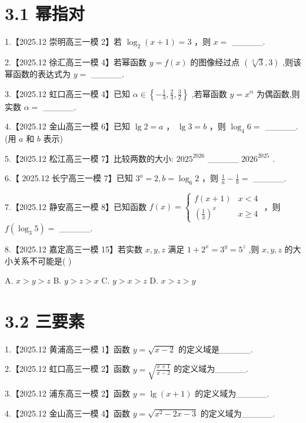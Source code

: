 \documentclass[10pt]{article}
\begin{document}
\section*{3.1 幂指对}

1.【2025.12 崇明高三一模 2】若 \({\log }_{2}\left( {x + 1}\right)  = 3\) ，则 \(x =\) \_\_\_\_\_.

2.【2025.12 徐汇高三一模 4】若幂函数 \(y = f\left( x\right)\) 的图像经过点 \(\left( {\sqrt[3]{3},3}\right)\) ,则该幂函数的表达式为 \(y =\) \_\_\_\_\_.

3.【2025.12 虹口高三一模 4】已知 \(\alpha  \in  \left\{  {-\frac{1}{3},\frac{2}{3},\frac{3}{2}}\right\}\) ,若幂函数 \(y = {x}^{\alpha }\) 为偶函数,则实数 \(\alpha  =\) \_\_\_\_\_.

4.【2025.12 金山高三一模 6】已知 \(\lg 2 = a\) ， \(\lg 3 = b\) ，则 \({\log }_{4}6 =\) \_\_\_\_\_. (用 \(a\) 和 \(b\) 表示)

5.【2025.12 松江高三一模 7】比较两数的大小: \({2025}^{2026}\) \_\_\_\_\_ \({2026}^{2025}\) .

6.【 2025.12 长宁高三一模 7】已知 \({3}^{a} = 2,b = {\log }_{6}2\) ，则 \(\frac{1}{a} - \frac{1}{b} =\) \_\_\_\_\_.

7.【2025.12 静安高三一模 8】已知函数 \(f\left( x\right)  = \left\{  \begin{array}{ll} f\left( {x + 1}\right) & x < 4 \\  {\left( \frac{1}{3}\right) }^{x} & x \geq  4 \end{array}\right.\) ，则 \(f\left( {{\log }_{3}5}\right)  =\) \_\_\_\_\_.

8.【2025.12 嘉定高三一模 15】若实数 \(x,y,z\) 满足 \(1 + {2}^{x} = {3}^{y} = {5}^{z}\) ,则 \(x,y,z\) 的大小关系不可能是( )

A. \(x > y > z\) B. \(y > z > x\) C. \(y > x > z\) D. \(x > z > y\)

\section*{3.2 三要素}

1.【2025.12 黄浦高三一模 1】函数 \(y = \sqrt{x - 2}\) 的定义域是\_\_\_\_\_.

2.【2025.12 虹口高三一模 2】函数 \(y = \sqrt{\frac{x + 1}{x - 2}}\) 的定义域为\_\_\_\_\_.

3.【2025.12 浦东高三一模 2】函数 \(y = \lg \left( {x + 1}\right)\) 的定义域为\_\_\_\_\_.

4.【2025.12 金山高三一模 4】函数 \(y = \sqrt{{x}^{2} - {2x} - 3}\) 的定义域为\_\_\_\_\_.
\end{document}
